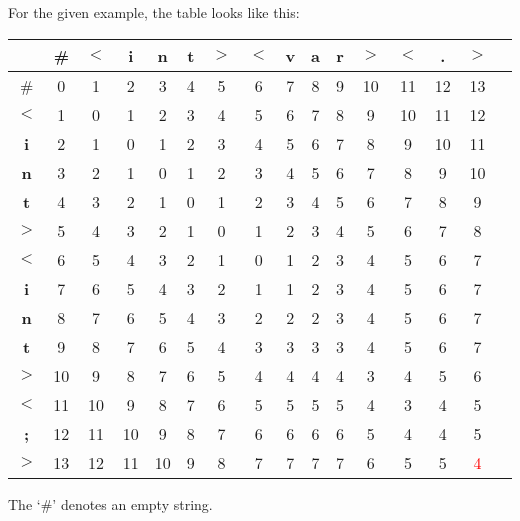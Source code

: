 \documentclass[addpoints]{exam}
\begin{document}
\begin{questions}
\begin{solution}
\begin{enumerate}
          For the given example, the table looks like this:
          \begin{center}
            \begin{tabular}{| c | c | c | c | c | c | c | c | c | c | c | c | c | c | c | c |}
              \hline & \textbf{\#} & $<$ & \textbf{i} & \textbf{n} & \textbf{t} & $>$ & $<$ & \textbf{v} & \textbf{a} & \textbf{r} & $>$ & $<$ & \textbf{.} & $>$  \\ \hline 
            \# & 0 & 1 & 2 & 3 & 4 & 5 & 6 & 7 & 8 & 9 & 10 & 11 & 12 & 13 \\ \hline
            $<$ & 1 & 0 & 1 & 2 & 3 & 4 & 5 & 6 & 7 & 8 & 9 & 10 & 11 & 12 \\ \hline
            \textbf{i} & 2 & 1 & 0 & 1 & 2 & 3 & 4 & 5 & 6 & 7 & 8 & 9 & 10 & 11 \\ \hline
            \textbf{n} & 3 & 2 & 1 & 0 & 1 & 2 & 3 & 4 & 5 & 6 & 7 & 8 & 9 & 10 \\ \hline
            \textbf{t} & 4 & 3 & 2 & 1 & 0 & 1 & 2 & 3 & 4 & 5 & 6 & 7 & 8 & 9 \\ \hline
            $>$ & 5 & 4 & 3 & 2 & 1 & 0 & 1 & 2 & 3 & 4 & 5 & 6 & 7 & 8 \\ \hline
            $<$ & 6 & 5 & 4 & 3 & 2 & 1 & 0 & 1 & 2 & 3 & 4 & 5 & 6 & 7 \\ \hline
            \textbf{i} & 7 & 6 & 5 & 4 & 3 & 2 & 1 & 1 & 2 & 3 & 4 & 5 & 6 & 7 \\ \hline
            \textbf{n} & 8 & 7 & 6 & 5 & 4 & 3 & 2 & 2 & 2 & 3 & 4 & 5 & 6 & 7 \\ \hline
            \textbf{t} & 9 & 8 & 7 & 6 & 5 & 4 & 3 & 3 & 3 & 3 & 4 & 5 & 6 & 7 \\ \hline
            $>$ & 10 & 9 & 8 & 7 & 6 & 5 & 4 & 4 & 4 & 4 & 3 & 4 & 5 & 6 \\ \hline
            $<$ & 11 & 10 & 9 & 8 & 7 & 6 & 5 & 5 & 5 & 5 & 4 & 3 & 4 & 5 \\ \hline
            \textbf{;} & 12 & 11 & 10 & 9 & 8 & 7 & 6 & 6 & 6 & 6 & 5 & 4 & 4 & 5 \\ \hline
            $>$ & 13 & 12 & 11 & 10 & 9 & 8 & 7 & 7 & 7 & 7 & 6 & 5 & 5 & \textcolor{red}{4} \\ \hline
          \end{tabular}
        \end{center}
        The `\#' denotes an empty string.
      \end{enumerate}

    \end{solution}
\end{questions}
\end{document}
